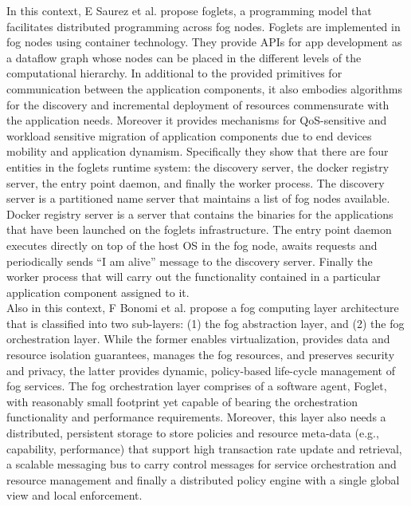 \noindent\tab In this context, E Saurez et al. \cite{saurez2016incremental} propose foglets, a programming model that facilitates distributed programming across fog nodes. Foglets are implemented in fog nodes using container technology. They provide APIs for app development as a dataflow graph whose nodes can be placed in the different levels of the computational hierarchy. In additional to the provided primitives for communication between the application components, it also embodies algorithms for the discovery and incremental deployment of resources commensurate with the application needs. Moreover it provides mechanisms for QoS-sensitive and workload sensitive migration of application components due to end devices mobility and application dynamism. Specifically they show that there are four entities in the foglets runtime system: the discovery server, the docker registry server, the entry point daemon, and finally the worker process. The discovery server is a partitioned name server that maintains a list of fog nodes available. Docker registry server is a server that contains the binaries for the applications that have been launched on the foglets infrastructure. The entry point daemon executes directly on top of the host OS in the fog node, awaits requests and periodically sends ``I am alive'' message to the discovery server. Finally the worker process that will carry out the functionality contained in a particular application component assigned to it.\\

\noindent\tab Also in this context, F Bonomi et al. \cite{bonomi2014fog} propose a fog computing layer architecture that is classified into two sub-layers: (1) the fog abstraction layer, and (2) the fog orchestration layer. While the former enables virtualization, provides data and resource isolation guarantees, manages the fog resources, and preserves security and privacy, the latter provides dynamic, policy-based life-cycle management of fog services. The fog orchestration layer comprises of a software agent, Foglet, with reasonably small footprint yet capable of bearing the orchestration functionality and performance requirements. Moreover, this layer also needs a distributed, persistent storage to store policies and resource meta-data (e.g., capability, performance) that support high transaction rate update and retrieval, a scalable messaging bus to carry control messages for service orchestration and resource management and finally a distributed policy engine with a single global view and local enforcement.\\

